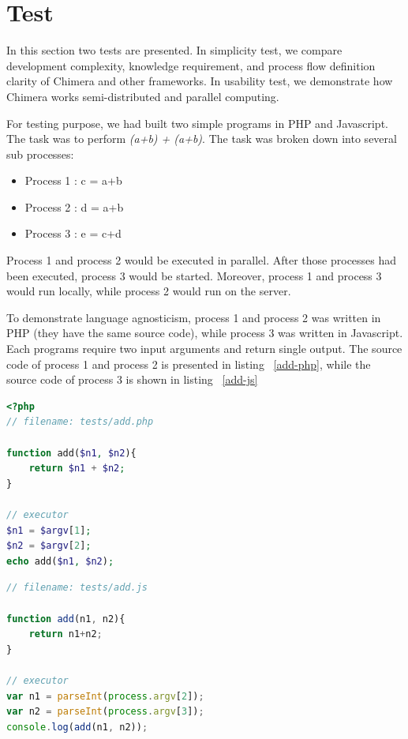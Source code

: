 \documentclass[conference]{IEEEtran}
\begin{document}
\section{Test}

In this section two tests are presented. In simplicity test, we compare development complexity,
knowledge requirement, and process flow definition clarity of Chimera and other frameworks. In
usability test, we demonstrate how Chimera works semi-distributed and parallel computing.

For testing purpose, we had built two simple programs in PHP and Javascript. The task was to perform
{\it (a+b) + (a+b)}. The task was broken down into several sub processes:

\begin{itemize}
    \item Process 1 : c = a+b
    \item Process 2 : d = a+b 
    \item Process 3 : e = c+d 
\end{itemize}

Process 1 and process 2 would be executed in parallel. After those processes had been executed, process
3 would be started. Moreover, process 1 and process 3 would run locally, while process 2 would run on the
server.

To demonstrate language agnosticism, process 1 and process 2 was written in PHP (they have the same source 
code), while process 3 was written in Javascript. Each programs require two input arguments and return 
single output. The source code of process 1 and process 2 is presented in listing ~\ref{add-php}, 
while the source code of process 3 is shown in listing ~\ref{add-js}

\begin{lstlisting}[caption=Source Code of Process 1 and Process 2, label=add-php, language=php, basicstyle=\small, breaklines=true]
<?php
// filename: tests/add.php

function add($n1, $n2){
    return $n1 + $n2;
}

// executor
$n1 = $argv[1];
$n2 = $argv[2];
echo add($n1, $n2);
\end{lstlisting}


\begin{lstlisting}[caption=Source Code of Process 3, label=add-js, language=javascript, basicstyle=\small, breaklines=true]
// filename: tests/add.js

function add(n1, n2){
    return n1+n2;
}

// executor
var n1 = parseInt(process.argv[2]);
var n2 = parseInt(process.argv[3]);
console.log(add(n1, n2));
\end{lstlisting}
\end{document}
